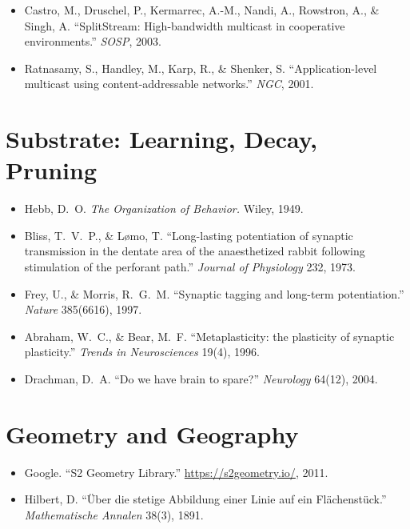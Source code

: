 \documentclass[twoside,nobib]{tufte-book}
\begin{document}
\begin{itemize}\setlength\itemsep{0.2em}
  \item Castro, M., Druschel, P., Kermarrec, A.-M., Nandi, A.,
    Rowstron, A., \& Singh, A. ``SplitStream: High-bandwidth
    multicast in cooperative environments.'' \emph{SOSP},
    2003.
  \item Ratnasamy, S., Handley, M., Karp, R., \& Shenker, S.
    ``Application-level multicast using content-addressable
    networks.'' \emph{NGC}, 2001.
\end{itemize}

\section*{Substrate: Learning, Decay, Pruning}

\begin{itemize}\setlength\itemsep{0.2em}
  \item Hebb, D.~O. \emph{The Organization of Behavior.}
    Wiley, 1949.
  \item Bliss, T.~V.~P., \& L\o mo, T. ``Long-lasting potentiation
    of synaptic transmission in the dentate area of the
    anaesthetized rabbit following stimulation of the
    perforant path.'' \emph{Journal of Physiology} 232,
    1973.
  \item Frey, U., \& Morris, R.~G.~M. ``Synaptic tagging and
    long-term potentiation.'' \emph{Nature} 385(6616), 1997.
  \item Abraham, W.~C., \& Bear, M.~F. ``Metaplasticity: the
    plasticity of synaptic plasticity.'' \emph{Trends in
    Neurosciences} 19(4), 1996.
  \item Drachman, D.~A. ``Do we have brain to spare?''
    \emph{Neurology} 64(12), 2004.
\end{itemize}

\section*{Geometry and Geography}

\begin{itemize}\setlength\itemsep{0.2em}
  \item Google. ``S2 Geometry Library.''
    \url{https://s2geometry.io/}, 2011.
  \item Hilbert, D. ``\"Uber die stetige Abbildung einer Linie auf
    ein Fl\"achenst\"uck.'' \emph{Mathematische Annalen}
    38(3), 1891.
\end{itemize}
\end{document}
